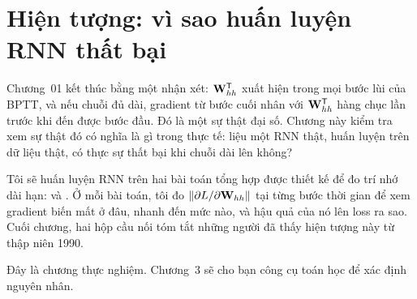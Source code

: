 \chapter{Hiện tượng: vì sao huấn luyện RNN thất bại}
\label{ch:hien-tuong}

Chương~01 kết thúc bằng một nhận xét: $\mathbf{W}_{hh}^{\mathsf{T}}$ xuất hiện trong
mọi bước lùi của BPTT, và nếu chuỗi đủ dài, gradient từ bước cuối nhân với
$\mathbf{W}_{hh}^{\mathsf{T}}$ hàng chục lần trước khi đến được bước đầu. Đó là một
sự thật đại số. Chương này kiểm tra xem sự thật đó có nghĩa là gì trong thực
tế: liệu một RNN thật, huấn luyện trên dữ liệu thật, có thực sự thất bại khi
chuỗi dài lên không?

Tôi sẽ huấn luyện RNN trên hai bài toán tổng hợp được thiết kế để đo trí nhớ
dài hạn:  và . Ở mỗi bài toán, tôi đo $\|\partial L / \partial \mathbf{W}_{hh}\|$ tại
từng bước thời gian để xem gradient biến mất ở đâu, nhanh đến mức nào, và
hậu quả của nó lên loss ra sao. Cuối chương, hai hộp cầu nối tóm tắt những
người đã thấy hiện tượng này từ thập niên 1990.

Đây là chương thực nghiệm. Chương~3 sẽ cho bạn công cụ toán học để xác định
nguyên nhân.








